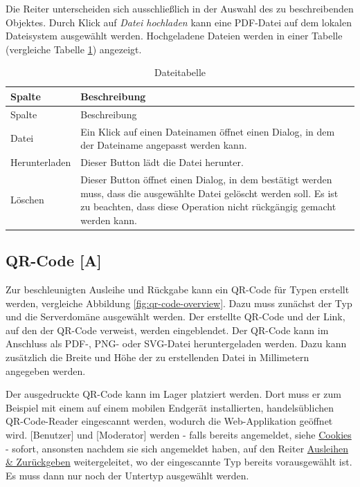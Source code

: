 \documentclass[
]{article}
\begin{document}
Die Reiter unterscheiden sich ausschließlich in der Auswahl des zu beschreibenden Objektes. Durch Klick auf \emph{Datei hochladen} kann eine PDF-Datei auf dem lokalen Dateisystem ausgewählt werden. Hochgeladene Dateien werden in einer Tabelle (vergleiche Tabelle \ref{tab:file-table}) angezeigt.

\begin{longtable}[]{@{}
  >{\raggedright\arraybackslash}p{}
  >{\raggedright\arraybackslash}p{}@{}}
\caption{\label{tab:file-table} Dateitabelle}\tabularnewline
\toprule
Spalte & Beschreibung \\
\midrule
\endfirsthead
\toprule
Spalte & Beschreibung \\
\midrule
\endhead
Datei & Ein Klick auf einen Dateinamen öffnet einen Dialog, in dem der Dateiname angepasst werden kann. \\
Herunterladen & Dieser Button lädt die Datei herunter. \\
Löschen & Dieser Button öffnet einen Dialog, in dem bestätigt werden muss, dass die ausgewählte Datei gelöscht werden soll. Es ist zu beachten, dass diese Operation nicht rückgängig gemacht werden kann. \\
\bottomrule
\end{longtable}

\hypertarget{qrcode}{%
\subsection{QR-Code {[}A{]}}\label{qrcode}}

Zur beschleunigten Ausleihe und Rückgabe kann ein QR-Code für Typen erstellt werden, vergleiche Abbildung \ref{fig:qr-code-overview}. Dazu muss zunächst der Typ und die Serverdomäne ausgewählt werden. Der erstellte QR-Code und der Link, auf den der QR-Code verweist, werden eingeblendet. Der QR-Code kann im Anschluss als PDF-, PNG- oder SVG-Datei heruntergeladen werden. Dazu kann zusätzlich die Breite und Höhe der zu erstellenden Datei in Millimetern angegeben werden.

Der ausgedruckte QR-Code kann im Lager platziert werden. Dort muss er zum Beispiel mit einem auf einem mobilen Endgerät installierten, handelsüblichen QR-Code-Reader eingescannt werden, wodurch die Web-Applikation geöffnet wird. {[}Benutzer{]} und {[}Moderator{]} werden - falls bereits angemeldet, siehe \protect\hyperlink{cookies}{Cookies} - sofort, ansonsten nachdem sie sich angemeldet haben, auf den Reiter \protect\hyperlink{operate}{Ausleihen \& Zurückgeben} weitergeleitet, wo der eingescannte Typ bereits vorausgewählt ist. Es muss dann nur noch der Untertyp ausgewählt werden.
\end{document}
